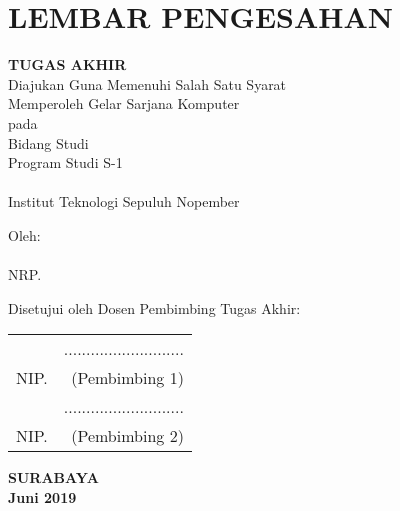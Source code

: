 \chapter{LEMBAR PENGESAHAN}
\small

\begin{center}
	\textbf{\MakeUppercase\judul}
	\vspace*{0.3em}
	
	\textbf{TUGAS AKHIR} \\
	Diajukan Guna Memenuhi Salah Satu Syarat\\
	Memperoleh Gelar Sarjana Komputer\\
	pada\\
	Bidang Studi \rmk\\
	Program Studi S-1 \jurusan\\
	\fakultas \\
	Institut Teknologi Sepuluh Nopember
	
	\vspace*{0.3em}
	
	Oleh:\\
	\textbf{\penulis} \\
	NRP. \nrp
	
	\vspace*{1.1em}
\end{center}

Disetujui oleh Dosen Pembimbing Tugas Akhir: \\
\vspace*{1.3em}

\begin{tabularx}{\linewidth}{ @{}l r }
	\pembimbingsatu & ........................... \vspace*{1.4em} \\
	NIP. \nikpembimbingsatu & (Pembimbing 1) \vspace*{2.6em} \\
	
	\pembimbingdua & ........................... \vspace*{1.4em} \\
	NIP. \nikpembimbingdua & (Pembimbing 2) \vspace*{0.9em}
\end{tabularx}

\begin{center}
	\textbf {SURABAYA} \\
	\textbf {Juni 2019}
\end{center}

\normalsize
\cleardoublepage